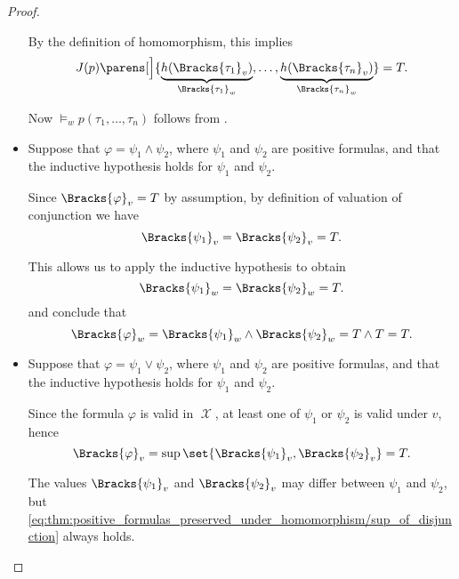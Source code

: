 \begin{proof}
\begin{itemize}
    By the definition of homomorphism, this implies
    \begin{equation}\label{eq:thm:positive_formulas_preserved_under_homomorphism/predicates/y}
      J(p) \parens[\Big]{ \underbrace{h(\Bracks{\tau_1}_v)}_{\Bracks{\tau_1}_w}, \ldots, \underbrace{h(\Bracks{\tau_n}_v)}_{\Bracks{\tau_n}_w} } = T.
    \end{equation}

    Now \( \vDash_w p(\tau_1, \ldots, \tau_n) \) follows from .

    \item Suppose that \( \varphi = \psi_1 \wedge \psi_2 \), where \( \psi_1 \) and \( \psi_2 \) are positive formulas, and that the inductive hypothesis holds for \( \psi_1 \) and \( \psi_2 \).

    Since \( \Bracks{\varphi}_v = T \) by assumption, by definition of valuation of conjunction we have
    \begin{equation*}
      \Bracks{\psi_1}_v
      =
      \Bracks{\psi_2}_v
      =
      T.
    \end{equation*}

    This allows us to apply the inductive hypothesis to obtain
    \begin{equation*}
      \Bracks{\psi_1}_w
      =
      \Bracks{\psi_2}_w
      =
      T.
    \end{equation*}
    and conclude that
    \begin{equation*}
      \Bracks{\varphi}_w
      =
      \Bracks{\psi_1}_w \wedge \Bracks{\psi_2}_w
      =
      T \wedge T
      =
      T.
    \end{equation*}

    \item Suppose that \( \varphi = \psi_1 \vee \psi_2 \), where \( \psi_1 \) and \( \psi_2 \) are positive formulas, and that the inductive hypothesis holds for \( \psi_1 \) and \( \psi_2 \).

    Since the formula \( \varphi \) is valid in \( \mscrX \), at least one of \( \psi_1 \) or \( \psi_2 \) is valid under \( v \), hence
    \begin{equation}\label{eq:thm:positive_formulas_preserved_under_homomorphism/sup_of_disjunction}
      \Bracks{\varphi}_v = \sup\set{ \Bracks{\psi_1}_v, \Bracks{\psi_2}_v } = T.
    \end{equation}

    The values \( \Bracks{\psi_1}_v \) and \( \Bracks{\psi_2}_v \) may differ between \( \psi_1 \) and \( \psi_2 \), but \eqref{eq:thm:positive_formulas_preserved_under_homomorphism/sup_of_disjunction} always holds.


\end{itemize}
\end{proof}

